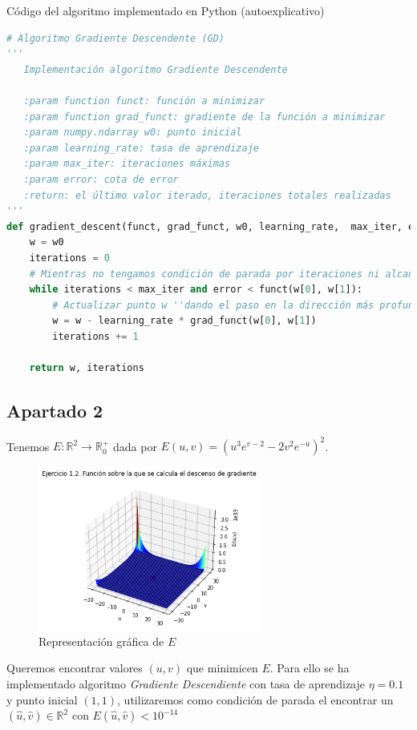 \documentclass[11pt,a4paper]{article}
\theoremstyle{definition}
\newcommand{\R}{\mathbb{R}}
\begin{document}
	Código del algoritmo implementado en Python (autoexplicativo)
	
	\begin{lstlisting}[language=Python, caption= Implementaci\'on del algoritmo Gradiente Descendente en Python, inputencoding=latin1]
   # Algoritmo Gradiente Descendente (GD)
'''
   Implementación algoritmo Gradiente Descendente

   :param function funct: función a minimizar
   :param function grad_funct: gradiente de la función a minimizar
   :param numpy.ndarray w0: punto inicial
   :param learning_rate: tasa de aprendizaje
   :param max_iter: iteraciones máximas
   :param error: cota de error
   :return: el último valor iterado, iteraciones totales realizadas
'''
def gradient_descent(funct, grad_funct, w0, learning_rate,  max_iter, error):
    w = w0
    iterations = 0
    # Mientras no tengamos condición de parada por iteraciones ni alcancemos la cota de error
    while iterations < max_iter and error < funct(w[0], w[1]):
        # Actualizar punto w ''dando el paso en la dirección más profunda'' (proporcional a la tasa de aprendizaje)
        w = w - learning_rate * grad_funct(w[0], w[1]) 
        iterations += 1
        
    return w, iterations    
	\end{lstlisting}
	
	\subsection{Apartado 2}
	Tenemos $E\colon \R^2 \to \R_0^+$ dada por $E(u,v)=(u^3e^{v-2}-2v^2e^{-u})^2$. 
	\begin{figure}[h!]
	\centering
	\includegraphics[width=0.65\textwidth]{images/plotE}
	\caption{Representación gráfica de $E$}
	\end{figure}
	
	Queremos encontrar valores $(u,v)$ que minimicen $E$. Para ello se ha implementado algoritmo \textit{Gradiente Descendiente} con tasa de aprendizaje $\eta = 0.1$ y punto inicial $(1,1)$, utilizaremos como condición de parada el encontrar un  $(\hat u,\hat v) \in \R^2$ con $E(\hat u, \hat v) < 10^{-14}$%
	
\end{document}
